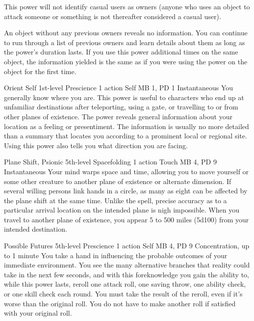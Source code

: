   This power will not identify casual users as owners
  (anyone who uses an object to attack someone
  or something is not thereafter considered a casual user).
  
  An object without any previous owners reveals no information.
  You can continue to run through a list of previous owners
  and learn details about them as long as the power's duration lasts.
  If you use this power additional times on the same object,
  the information yielded is the same
  as if you were using the power on the object for the first time.

\DndPowerHeader%
  {Orient Self}
  {1st-level Prescience}
  {1 action}
  {Self}
  {MB 1, PD 1}
  {Instantaneous}
You generally know where you are.
This power is useful to characters who end up at unfamiliar destinations
after teleporting,
using a gate,
or travelling to or from other planes of existence.
The power reveals general information about your location
as a feeling or presentiment.
The information is usually no more detailed than a summary
that locates you according to a prominent local or regional site.
Using this power also tells you what direction you are facing.

\DndPowerHeader%
  {Plane Shift, Psionic}
  {5th-level Spacefolding}
  {1 action}
  {Touch}
  {MB 4, PD 9}
  {Instantaneous}
  Your mind warps space and time,
  allowing you to move yourself
  or some other creature to another plane of existence
  or alternate dimension.
  If several willing persons link hands in a circle,
  as many as eight can be affected by the plane shift at the same time.
  Unlike the  spell,
  precise accuracy as to a particular arrival location
  on the intended plane is nigh impossible.
  When you travel to another plane of existence,
  you appear 5 to 500 miles (5d100) from your intended destination.

\DndPowerHeader%
  {Possible Futures}
  {5th-level Prescience}
  {1 action}
  {Self}
  {MB 4, PD 9}
  {Concentration, up to 1 minute}
  You take a hand in influencing the probable outcomes
  of your immediate environment.
  You see the many alternative branches that reality could take
  in the next few seconds,
  and with this foreknowledge you gain the ability to,
  while this power lasts,
  reroll one attack roll,
  one saving throw,
  one ability check,
  or one skill check each round.
  You must take the result of the reroll,
  even if it's worse than the original roll.
  You do not have to make another roll
  if satisfied with your original roll.

